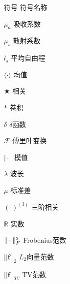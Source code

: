 \XDUpremainmatter

\begin{symbollist}
\item [符号] \hspace{12em} {符号名称}
\item [$\mu_{a}$]\hspace{12.5em} {吸收系数}
\item [$\mu_{s}$]\hspace{12.5em} {散射系数}
\item [$l_{s}$] \hspace{12.5em} {平均自由程}
\item [$\langle \cdot \rangle$] \hspace{12.5em} {均值}
\item [$\bigstar$] \hspace{12.5em} {相关}
\item [$*$] \hspace{12.5em} {卷积}
\item [$\delta$] \hspace{12.5em} {$\delta$函数}
\item [$\mathcal{F}$] \hspace{12.5em} {傅里叶变换}
\item [$\mid \cdot \mid $] \hspace{12.5em} {模值}
\item [$\lambda$] \hspace{12.5em} {波长}
\item [$\mu$] \hspace{12.5em} {标准差}
\item [$(\cdot)^{(3)}$] \hspace{12.5em} {三阶相关}
\item [$\mathbb{R} $] \hspace{12.5em} {实数}
\item [$\Arrowvert \cdot \Arrowvert_F^{2}$] \hspace{12.5em} {Frobenius范数}
\item [$\vert\vert \mathbf{f}\vert\vert_2  $] \hspace{12.5em} {$L_{2}$向量范数}
\item [$\vert\vert \mathbf{f} \vert\vert_{TV} $] \hspace{12.5em} {TV范数}
\end{symbollist}

